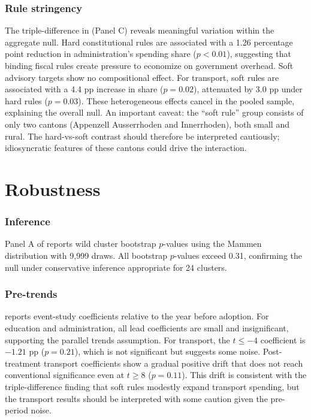 \documentclass[12pt]{article}
\begin{document}
\subsubsection*{Rule stringency} The triple-difference in  (Panel C) reveals meaningful variation within the aggregate null. Hard constitutional rules are associated with a 1.26 percentage point reduction in administration's spending share ($p < 0.01$), suggesting that binding fiscal rules create pressure to economize on government overhead. Soft advisory targets show no compositional effect. For transport, soft rules are associated with a 4.4 pp increase in share ($p = 0.02$), attenuated by 3.0 pp under hard rules ($p = 0.03$). These heterogeneous effects cancel in the pooled sample, explaining the overall null. An important caveat: the ``soft rule'' group consists of only two cantons (Appenzell Ausserrhoden and Innerrhoden), both small and rural. The hard-vs-soft contrast should therefore be interpreted cautiously; idiosyncratic features of these cantons could drive the interaction.


\section{Robustness}\label{sec:robust}





\subsubsection*{Inference} Panel A of  reports wild cluster bootstrap $p$-values using the Mammen distribution with 9,999 draws. All bootstrap $p$-values exceed 0.31, confirming the null under conservative inference appropriate for 24 clusters.

\subsubsection*{Pre-trends}  reports event-study coefficients relative to the year before adoption. For education and administration, all lead coefficients are small and insignificant, supporting the parallel trends assumption. For transport, the $t \leq -4$ coefficient is $-1.21$ pp ($p = 0.21$), which is not significant but suggests some noise. Post-treatment transport coefficients show a gradual positive drift that does not reach conventional significance even at $t \geq 8$ ($p = 0.11$). This drift is consistent with the triple-difference finding that soft rules modestly expand transport spending, but the transport results should be interpreted with some caution given the pre-period noise.
\end{document}
